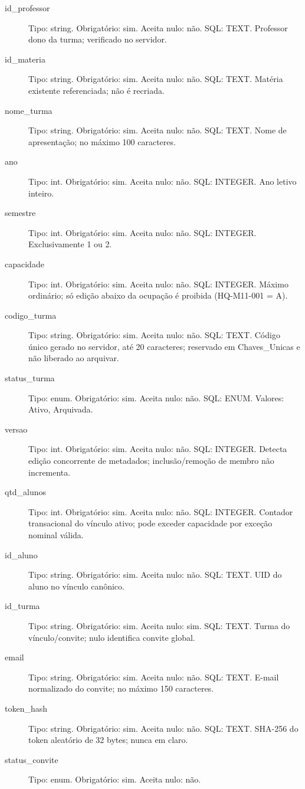 \begin{description}
\item[id\_professor] Tipo: string. Obrigatório: sim. Aceita nulo: não.
SQL: TEXT.
Professor dono da turma; verificado no servidor.
\item[id\_materia] Tipo: string. Obrigatório: sim. Aceita nulo: não.
SQL: TEXT.
Matéria existente referenciada; não é recriada.
\item[nome\_turma] Tipo: string. Obrigatório: sim. Aceita nulo: não.
SQL: TEXT.
Nome de apresentação; no máximo 100 caracteres.
\item[ano] Tipo: int. Obrigatório: sim. Aceita nulo: não.
SQL: INTEGER.
Ano letivo inteiro.
\item[semestre] Tipo: int. Obrigatório: sim. Aceita nulo: não.
SQL: INTEGER.
Exclusivamente 1 ou 2.
\item[capacidade] Tipo: int. Obrigatório: sim. Aceita nulo: não.
SQL: INTEGER.
Máximo ordinário; só edição abaixo da ocupação é proibida (HQ-M11-001 = A).
\item[codigo\_turma] Tipo: string. Obrigatório: sim. Aceita nulo: não.
SQL: TEXT.
Código único gerado no servidor, até 20 caracteres; reservado em Chaves\_Unicas e não liberado ao arquivar.
\item[status\_turma] Tipo: enum. Obrigatório: sim. Aceita nulo: não.
SQL: ENUM.
Valores: Ativo, Arquivada.
\item[versao] Tipo: int. Obrigatório: sim. Aceita nulo: não.
SQL: INTEGER.
Detecta edição concorrente de metadados; inclusão/remoção de membro não incrementa.
\item[qtd\_alunos] Tipo: int. Obrigatório: sim. Aceita nulo: não.
SQL: INTEGER.
Contador transacional do vínculo ativo; pode exceder capacidade por exceção nominal válida.
\item[id\_aluno] Tipo: string. Obrigatório: sim. Aceita nulo: não.
SQL: TEXT.
UID do aluno no vínculo canônico.
\item[id\_turma] Tipo: string. Obrigatório: sim. Aceita nulo: sim.
SQL: TEXT.
Turma do vínculo/convite; nulo identifica convite global.
\item[email] Tipo: string. Obrigatório: sim. Aceita nulo: não.
SQL: TEXT.
E-mail normalizado do convite; no máximo 150 caracteres.
\item[token\_hash] Tipo: string. Obrigatório: sim. Aceita nulo: não.
SQL: TEXT.
SHA-256 do token aleatório de 32 bytes; nunca em claro.
\item[status\_convite] Tipo: enum. Obrigatório: sim. Aceita nulo: não.

\end{description}
